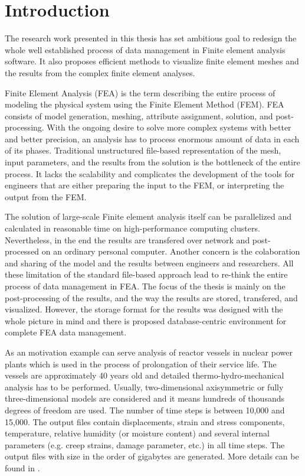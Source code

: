 \chapter{Introduction}
\label{chapter:introduction}

The research work presented in this thesis has set ambitious goal to redesign the whole well established process of data management in Finite element analysis software. It also proposes efficient methods to visualize finite element meshes and the results from the complex finite element analyses.

Finite Element Analysis (FEA) is the term describing the entire process of modeling the physical system using the Finite Element Method (FEM). FEA consists of model generation, meshing, attribute assignment, solution, and post-processing. With the ongoing desire to solve more complex systems with better and better precision, an analysis has to process enormous amount of data in each of its phases. Traditional unstructured file-based representation of the mesh, input parameters, and the results from the solution is the bottleneck of the entire process. It lacks the scalability and complicates the development of the tools for engineers that are either preparing the input to the FEM, or interpreting the output from the FEM.

The solution of large-scale Finite element analysis itself can be parallelized and calculated in reasonable time on high-performance computing clusters. Nevertheless, in the end the results are transfered over network and post-processed on an ordinary personal computer. Another concern is the colaboration and sharing of the model and the results between engineers and researchers. All these limitation of the standard file-based approach lead to re-think the entire process of data management in FEA. The focus of the thesis is mainly on the post-processing of the results, and the way the results are stored, transfered, and visualized. However, the storage format for the results was designed with the whole picture in mind and there is proposed database-centric environment for complete FEA data management.

As an motivation example can serve analysis of reactor vessels in nuclear power plants which is used in the process of prolongation of their service life. The vessels are approximately 40 years old and detailed thermo-hydro-mechanical analysis has to be performed. Usually, two-dimensional axisymmetric or fully three-dimensional models are considered and it means hundreds of thousands degrees of freedom are used. The number of time steps is between 10,000 and 15,000. The output files contain displacements, strain and stress components, temperature, relative humidity (or moisture content) and several internal parameters (e.g. creep strains, damage parameter, etc.) in all time steps. The output files with size in the order of gigabytes are generated. More details can be found in \cite{XXX-1,XXX-2}.

